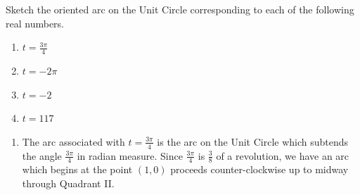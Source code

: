 \documentclass{ximera}
\begin{document}
\begin{example} \label{realwrap}  Sketch the oriented arc on the Unit Circle corresponding to each of the following real numbers.  

\begin{enumerate}

\item $t=\frac{3 \pi}{4}$

\item $t =  - 2 \pi$

\item $t = -2$

\item  $t = 117$

\end{enumerate}



\begin{explanation}

\begin{enumerate}

\item  The arc associated with $t = \frac{3 \pi}{4}$ is the arc on the Unit Circle which subtends the angle $\frac{3 \pi}{4}$ in radian measure.  Since $\frac{3 \pi}{4}$ is $\frac{3}{8}$ of a revolution, we have an arc which begins at the point $(1,0)$ proceeds counter-clockwise up to midway through Quadrant II.

\begin{image}
\end{image}
\end{enumerate}
\end{explanation}
\end{example}
\end{document}
